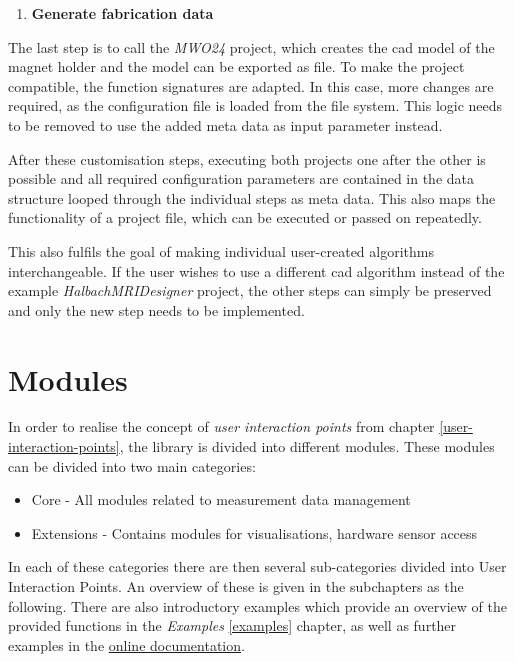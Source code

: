 \begin{enumerate}
\def\labelenumi{\arabic{enumi}.}
\setcounter{enumi}{2}
\tightlist
\item
  \textbf{Generate fabrication data}
\end{enumerate}

The last step is to call the \emph{MWO24}  project,
which creates the \gls{cad} model of the magnet holder and the model can
be exported as file. To make the project compatible, the function
signatures are adapted. In this case, more changes are required, as the
configuration file is loaded from the file system. This logic needs to
be removed to use the added meta data as input parameter instead.

After these customisation steps, executing both projects one after the
other is possible and all required configuration parameters are
contained in the data structure looped through the individual steps as
meta data. This also maps the functionality of a project file, which can
be executed or passed on repeatedly.

This also fulfils the goal of making individual user-created algorithms
interchangeable. If the user wishes to use a different \gls{cad}
algorithm instead of the example \emph{HalbachMRIDesigner}
 project, the other steps can simply be preserved and
only the new step needs to be implemented.

\hypertarget{modules}{%
\section{Modules}\label{modules}}

In order to realise the concept of \emph{user interaction points} from
chapter \ref{user-interaction-points}, the library is divided into
different modules. These modules can be divided into two main
categories:

\begin{itemize}
\tightlist
\item
  Core - All modules related to measurement data management
\item
  Extensions - Contains modules for visualisations, hardware sensor
  access
\end{itemize}

In each of these categories there are then several sub-categories
divided into User Interaction Points. An overview of these is given in
the subchapters as the following. There are also introductory examples
which provide an overview of the provided functions in the
\emph{Examples} \ref{examples} chapter, as well as further examples in
the
\href{https://magneticreadoutprocessing.readthedocs.io/en/latest/}{online documentation}.

